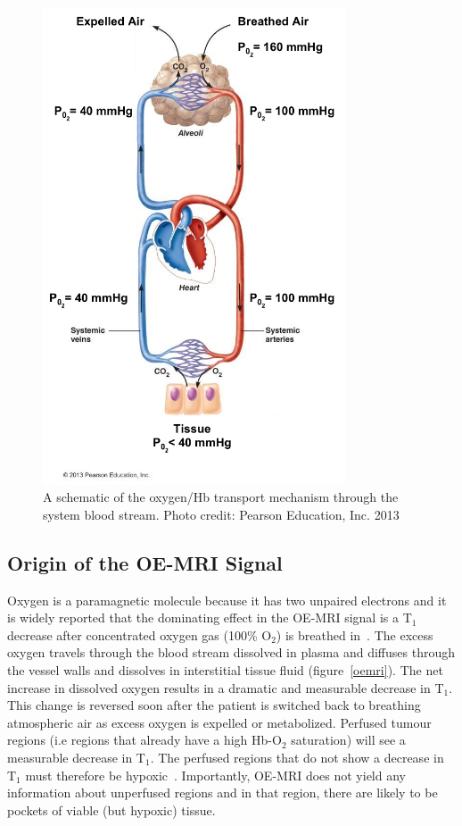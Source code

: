 \begin{figure}
    \includegraphics[width=0.8\textwidth]{./oemri_thesis1/oemri_thesis1-images/mmHg.png}
    \caption{A schematic of the oxygen/\acs{Hb} transport mechanism through the system blood stream. Photo credit: Pearson Education, Inc. 2013}
    \label{mmhg}
\end{figure}

\subsection{Origin of the OE-MRI Signal}

Oxygen is a paramagnetic molecule because it has two unpaired electrons and it is widely reported that the dominating effect in the OE-MRI signal is a T$_1$ decrease after concentrated oxygen gas (100\% O$_2$) is breathed in~\cite{OConnor:2016ee,Linnik:2013hf}. 
The excess oxygen travels through the blood stream dissolved in plasma and diffuses through the vessel walls and dissolves in interstitial tissue fluid (figure~\ref{oemri}).
The net increase in dissolved oxygen results in a dramatic and measurable decrease in T$_1$. 
This change is reversed soon after the patient is switched back to breathing atmospheric air as excess oxygen is expelled or metabolized. 
Perfused tumour regions (i.e regions that already have a high \acs{Hb}-O$_2$ saturation) will see a measurable decrease in T$_1$. 
The perfused regions that do not show a decrease in T$_1$ must therefore be hypoxic~\cite{OConnor:2016ee}. 
Importantly, OE-MRI does not yield any information about unperfused regions and in that region, there are likely to be pockets of viable (but hypoxic) tissue.

